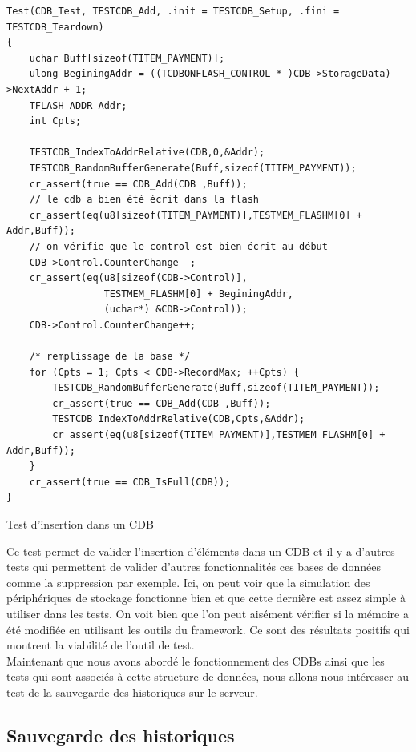 \documentclass[a4paper]{article}
\begin{document}
\begin{listing}[ht!]
\begin{verbatim}
Test(CDB_Test, TESTCDB_Add, .init = TESTCDB_Setup, .fini = TESTCDB_Teardown)
{
    uchar Buff[sizeof(TITEM_PAYMENT)];
    ulong BeginingAddr = ((TCDBONFLASH_CONTROL * )CDB->StorageData)->NextAddr + 1;
    TFLASH_ADDR Addr;
    int Cpts;

    TESTCDB_IndexToAddrRelative(CDB,0,&Addr);
    TESTCDB_RandomBufferGenerate(Buff,sizeof(TITEM_PAYMENT));
    cr_assert(true == CDB_Add(CDB ,Buff));
    // le cdb a bien été écrit dans la flash
    cr_assert(eq(u8[sizeof(TITEM_PAYMENT)],TESTMEM_FLASHM[0] + Addr,Buff));
    // on vérifie que le control est bien écrit au début
    CDB->Control.CounterChange--;
    cr_assert(eq(u8[sizeof(CDB->Control)],
                 TESTMEM_FLASHM[0] + BeginingAddr,
                 (uchar*) &CDB->Control));
    CDB->Control.CounterChange++;

    /* remplissage de la base */
    for (Cpts = 1; Cpts < CDB->RecordMax; ++Cpts) {
        TESTCDB_RandomBufferGenerate(Buff,sizeof(TITEM_PAYMENT));
        cr_assert(true == CDB_Add(CDB ,Buff));
        TESTCDB_IndexToAddrRelative(CDB,Cpts,&Addr);
        cr_assert(eq(u8[sizeof(TITEM_PAYMENT)],TESTMEM_FLASHM[0] + Addr,Buff));
    }
    cr_assert(true == CDB_IsFull(CDB));
}
\end{verbatim}
\caption{Test d'insertion dans un CDB}
\label{extestinsertcdb}
\end{listing}

Ce test permet de valider l'insertion d'éléments dans un CDB et il y a d'autres
tests qui permettent de valider d'autres fonctionnalités ces bases de données
comme la suppression par exemple. Ici, on peut voir que la simulation des
périphériques de stockage fonctionne bien et que cette dernière est assez simple
à utiliser dans les tests. On voit bien que l'on peut aisément vérifier si la
mémoire a été modifiée en utilisant les outils du framework. Ce sont des
résultats positifs qui montrent la viabilité de l'outil de test.\\

Maintenant que nous avons abordé le fonctionnement des CDBs ainsi que les tests
qui sont associés à cette structure de données, nous allons nous intéresser au
test de la sauvegarde des historiques sur le serveur.

\subsection{Sauvegarde des historiques}
\label{savehist}
\end{document}
